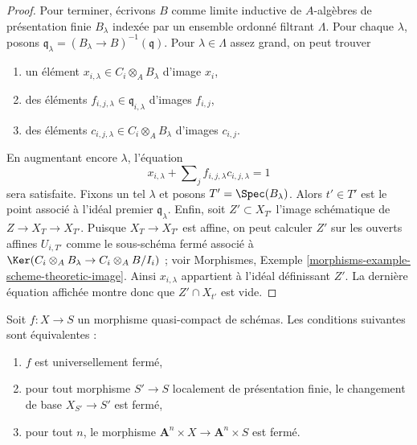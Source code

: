 \begin{proof}
\medskip\noindent
Pour terminer, écrivons $B$ comme limite inductive de
$A$-algèbres de présentation finie $B_\lambda$ indexée par un ensemble ordonné filtrant $\Lambda$.
Pour chaque $\lambda$, posons
$\mathfrak q_\lambda = (B_\lambda \to B)^{-1}(\mathfrak q)$.
Pour $\lambda \in \Lambda$ assez grand, on peut trouver
\begin{enumerate}
\item un élément
$x_{i, \lambda} \in C_i \otimes_A B_\lambda$ d'image $x_i$,
\item des éléments $f_{i, j, \lambda} \in \mathfrak q_{i, \lambda}$
d'images $f_{i, j}$,
\item des éléments $c_{i, j, \lambda} \in C_i \otimes_A B_\lambda$
d'images $c_{i, j}$.
\end{enumerate}
En augmentant encore $\lambda$, l'équation
$$
x_{i, \lambda} + \sum\nolimits_j f_{i, j, \lambda}c_{i, j, \lambda} = 1
$$
sera satisfaite. Fixons un tel $\lambda$ et posons $T' = \Spec(B_\lambda)$.
Alors $t' \in T'$ est le point associé à l'idéal premier $\mathfrak q_\lambda$.
Enfin, soit $Z' \subset X_{T'}$ l'image schématique de
$Z \to X_T \to X_{T'}$. Puisque $X_T \to X_{T'}$ est affine, on peut calculer $Z'$
sur les ouverts affines $U_{i, T'}$ comme le sous-schéma fermé associé
à $\Ker(C_i \otimes_A B_\lambda \to C_i \otimes_A B/I_i)$ ; voir
Morphismes, Exemple \ref{morphisms-example-scheme-theoretic-image}.
Ainsi $x_{i, \lambda}$ appartient à l'idéal définissant $Z'$. La dernière
équation affichée montre donc que $Z' \cap X_{t'}$ est vide.
\end{proof}

\begin{lemma}
\label{lemma-test-universally-closed}
Soit $f : X \to S$ un morphisme quasi-compact de schémas.
Les conditions suivantes sont équivalentes :
\begin{enumerate}
\item $f$ est universellement fermé,
\item pour tout morphisme $S' \to S$ localement de présentation finie,
le changement de base $X_{S'} \to S'$ est fermé,
\item pour tout $n$, le morphisme
$\mathbf{A}^n \times X \to \mathbf{A}^n \times S$
est fermé.
\end{enumerate}
\end{lemma}

